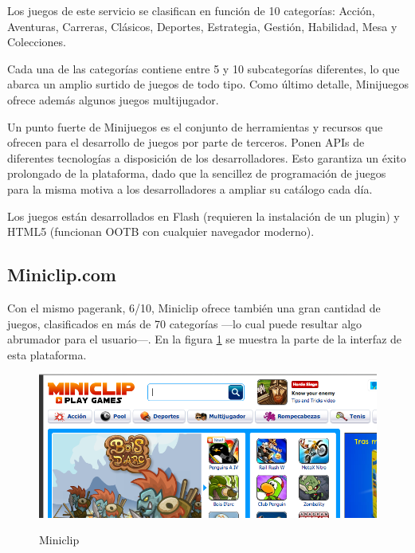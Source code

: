 Los juegos de este servicio se clasifican en función de 10 categorías: Acción, Aventuras, Carreras, Clásicos, Deportes, Estrategia, Gestión, Habilidad, Mesa y Colecciones.

Cada una de las categorías contiene entre 5 y 10 subcategorías diferentes, lo que abarca un amplio surtido de juegos de todo tipo. Como último detalle, Minijuegos ofrece además algunos juegos multijugador.


Un punto fuerte de Minijuegos es el conjunto de herramientas y recursos que ofrecen para el desarrollo de juegos por parte de terceros. Ponen \acs{API}s de diferentes tecnologías a disposición de los desarrolladores. Esto garantiza un éxito prolongado de la plataforma, dado que la sencillez de programación de juegos para la misma motiva a los desarrolladores a ampliar su catálogo cada día.

Los juegos están desarrollados en Flash (requieren la instalación de un plugin) y HTML5 (funcionan \acs{OOTB} con cualquier navegador moderno).

\subsection*{Miniclip.com}

Con el mismo pagerank, 6/10, Miniclip ofrece también una gran cantidad de juegos, clasificados en más de 70 categorías ---lo cual puede resultar algo abrumador para el usuario---. En la figura \ref{fig::miniclip} se muestra la parte de la interfaz de esta plataforma.

\begin{figure}[h]
  \begin{center}
    \includegraphics[width=\textwidth]{images/miniclip.png}
    \caption{Miniclip\footnotemark}
    \label{fig::miniclip}
  \end{center}
\end{figure}

